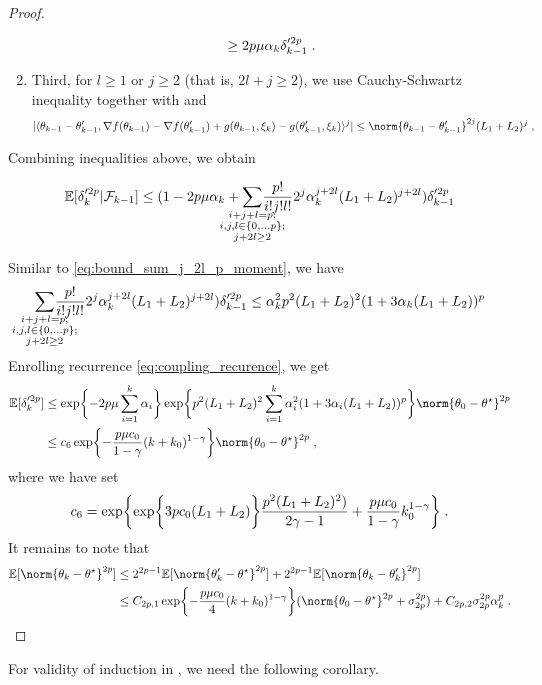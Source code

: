 \begin{proof}
\begin{enumerate}
\begin{align}
        \geq 2 p \mu \alpha_k \delta_{k-1}'^{2 p}\;.
        \end{align}
        \item Third, for $l \geq 1$ or $j \geq 2$ (that is,  $2l+j \geq 2$), we use Cauchy-Schwartz inequality together with  and 
    \begin{equation}
        |\langle\theta_{k-1}-\theta_{k-1}', \nabla f(\theta_{k-1}) -\nabla f(\theta_{k-1}') +g(\theta_{k-1}, \xi_k) - g(\theta_{k-1}', \xi_k) \rangle^j| \leq \norm{\theta_{k-1}-\theta_{k-1}'}^{2j}(L_1+L_2)^j\eqsp,
    \end{equation}
\end{enumerate}

Combining inequalities above, we obtain 

\begin{equation}
\label{eq:coupling_recurence}
    \PE[\delta_{k}'^{2p}|\F_{k-1}] \leq (1- 2p\mu\alpha_k+ \underset{\mathclap{\substack{i+j+l=p;\\ i,j,l \in \{0,\ldots p\};\\j+2l\geq 2}}}{\sum}\frac{p!}{i!j!l!}2^j\alpha_k^{j+2l}(L_1+L_2)^{j+2l})\delta_{k-1}'^{2p}
\end{equation}

Similar to \eqref{eq:bound_sum_j_2l_p_moment}, we have 
\begin{equation}
\underset{\mathclap{\substack{i+j+l=p;\\ i,j,l \in \{0,\ldots p\};\\j+2l\geq 2}}}{\sum}\frac{p!}{i!j!l!}2^j\alpha_k^{j+2l}(L_1+L_2)^{j+2l})\delta_{k-1}'^{2p} \leq \alpha_{k}^2p^2(L_1+L_2)^2(1+3\alpha_k(L_1+L_2))^{p}
\end{equation}
Enrolling recurrence \eqref{eq:coupling_recurence}, we get
\begin{align}
    \PE[\delta_{k}'^{2p}] &\leq \exp\biggl\{-2p\mu\sum_{i=1}^k\alpha_i\biggr\}\exp\biggl\{ p^2(L_1+L_2)^2\sum_{i=1}^k\alpha_i^{2}(1+3\alpha_i(L_1+L_2))^p\biggr\}\norm{\theta_0-\thetas}^{2p}\\ &\leq c_6\exp\biggl\{-\frac{p\mu c_0}{1-\gamma}(k+k_0)^{1-\gamma}\biggr\}\norm{\theta_0-\thetas}^{2p}\eqsp,
\end{align}
where we have set
\begin{equation}
    c_6 = \exp\biggl\{\exp\biggl\{ 3pc_0(L_1+L_2)\biggr\}\frac{p^2(L_1+L_2)^2)}{2\gamma-1} + \frac{p\mu c_0}{1-\gamma}k_0^{1-\gamma}\biggr\}\;.
\end{equation}
It remains to note that
\begin{align}
    \PE[\norm{\theta_k-\thetas}^{2p}]&\leq 2^{2p-1} \PE[\norm{\theta'_k-\thetas}^{2p}] + 2^{2p-1}\PE[\norm{\theta_k-\theta_k'}^{2p}] \\&\leq C_{2p,1} \exp\biggl\{-\frac{p\mu c_0}{4}(k+k_0)^{1-\gamma}\biggr\}(\norm{\theta_0-\thetas}^{2p} + \sigma_{2p}^{2p}) + C_{2p,2}\sigma_{2p}^{2p}\alpha_k^p\eqsp.
\end{align}
\end{proof}
For validity of induction in , we need the following corollary.

